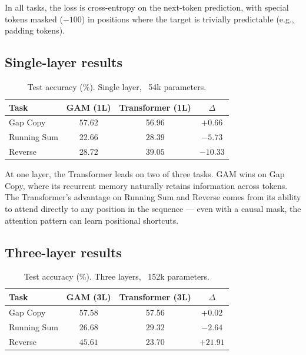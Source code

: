\documentclass[11pt,a4paper]{article}
\begin{document}
In all tasks, the loss is cross-entropy on the next-token prediction,
with special tokens masked ($-100$) in positions where the target is
trivially predictable (e.g., padding tokens).

\subsection{Single-layer results}
\label{sec:1layer}

\begin{table}[h]
\centering
\begin{tabular}{lccc}
\toprule
Task & GAM (1L) & Transformer (1L) & $\Delta$ \\
\midrule
Gap Copy  & $\mathbf{57.62}$ & 56.96 & $+0.66$ \\
Running Sum & 22.66 & $\mathbf{28.39}$ & $-5.73$ \\
Reverse   & 28.72 & $\mathbf{39.05}$ & $-10.33$ \\
\bottomrule
\end{tabular}
\caption{Test accuracy (\%).  Single layer, ~54k parameters.}
\label{tab:1layer}
\end{table}

At one layer, the Transformer leads on two of three tasks.  GAM wins
on Gap Copy, where its recurrent memory naturally retains information
across tokens.  The Transformer's advantage on Running Sum and Reverse
comes from its ability to attend directly to any position in the
sequence --- even with a causal mask, the attention pattern can learn
positional shortcuts.

\subsection{Three-layer results}
\label{sec:3layer}

\begin{table}[h]
\centering
\begin{tabular}{lccc}
\toprule
Task & GAM (3L) & Transformer (3L) & $\Delta$ \\
\midrule
Gap Copy  & $\mathbf{57.58}$ & 57.56 & $+0.02$ \\
Running Sum & 26.68 & $\mathbf{29.32}$ & $-2.64$ \\
Reverse   & $\mathbf{45.61}$ & 23.70 & $+21.91$ \\
\bottomrule
\end{tabular}
\caption{Test accuracy (\%).  Three layers, ~152k parameters.}
\label{tab:3layer}
\end{table}
\end{document}
